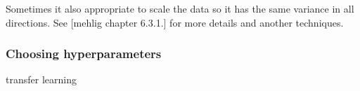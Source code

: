 Sometimes it also appropriate to scale the data so it has the same variance in all directions. See [mehlig chapter 6.3.1.] for more details and another techniques.

\subsubsection{Choosing hyperparameters}

transfer learning





